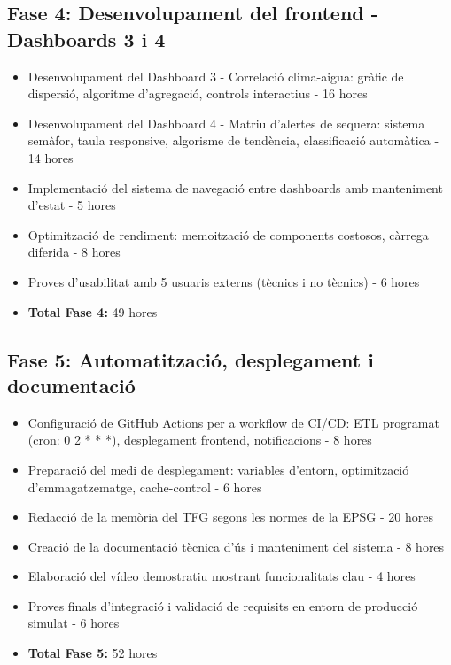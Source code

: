 \subsection{Fase 4: Desenvolupament del frontend - Dashboards 3 i 4}
\begin{itemize}
    \item Desenvolupament del Dashboard 3 - Correlació clima-aigua: gràfic de dispersió, algoritme d'agregació, controls interactius - 16 hores
    \item Desenvolupament del Dashboard 4 - Matriu d'alertes de sequera: sistema semàfor, taula responsive, algorisme de tendència, classificació automàtica - 14 hores
    \item Implementació del sistema de navegació entre dashboards amb manteniment d'estat - 5 hores
    \item Optimització de rendiment: memoització de components costosos, càrrega diferida - 8 hores
    \item Proves d'usabilitat amb 5 usuaris externs (tècnics i no tècnics) - 6 hores
    \item \textbf{Total Fase 4:} 49 hores
\end{itemize}

\subsection{Fase 5: Automatització, desplegament i documentació}
\begin{itemize}
    \item Configuració de GitHub Actions per a workflow de CI/CD: ETL programat (cron: 0 2 * * *), desplegament frontend, notificacions - 8 hores
    \item Preparació del medi de desplegament: variables d'entorn, optimització d'emmagatzematge, cache-control - 6 hores
    \item Redacció de la memòria del TFG segons les normes de la EPSG - 20 hores
    \item Creació de la documentació tècnica d'ús i manteniment del sistema - 8 hores
    \item Elaboració del vídeo demostratiu mostrant funcionalitats clau - 4 hores
    \item Proves finals d'integració i validació de requisits en entorn de producció simulat - 6 hores
    \item \textbf{Total Fase 5:} 52 hores
\end{itemize}

